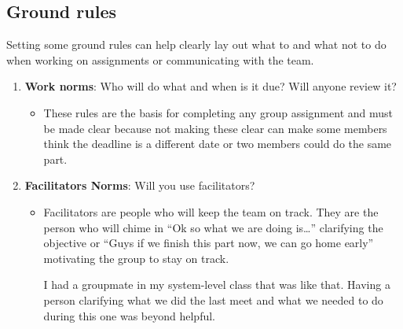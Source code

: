 \documentclass[
10pt, %
a4paper, %
oneside, %
headinclude,footinclude, %
BCOR5mm, %
]{scrartcl}
\begin{document}
\subsection{Ground rules}

Setting some ground rules can help clearly lay out what to and what not
to do when working on assignments or communicating with the team.

\begin{enumerate}
\item
  \textbf{Work norms}: Who will do what and when is it due? Will anyone
  review it?
\begin{itemize}
\item
  These rules are the basis for completing any group assignment and must
  be made clear because not making these clear can make some members
  think the deadline is a different date or two members could do the
  same part.
\end{itemize}
\item
  \textbf{Facilitators Norms}: Will you use facilitators?
\begin{itemize}
\item
  Facilitators are people who will keep the team on track. They are the
  person who will chime in ``Ok so what we are doing is\ldots{}''
  clarifying the objective or ``Guys if we finish this part now, we can
  go home early'' motivating the group to stay on track.

  I had a groupmate in my system-level class that was like that. Having
  a person clarifying what we did the last meet and what we needed to do
  during this one was beyond helpful.


\end{itemize}
\end{enumerate}
\end{document}
